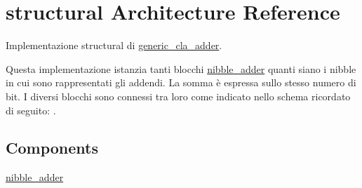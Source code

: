 \hypertarget{classgeneric__cla__adder_1_1structural}{}\section{structural Architecture Reference}
\label{classgeneric__cla__adder_1_1structural}


Implementazione structural di \hyperlink{classgeneric__cla__adder}{generic\+\_\+cla\+\_\+adder}.

Questa implementazione istanzia tanti blocchi \hyperlink{classnibble__adder}{nibble\+\_\+adder} quanti siano i nibble in cui sono rappresentati gli addendi. La somma è espressa sullo stesso numero di bit. I diversi blocchi sono connessi tra loro come indicato nello schema ricordato di seguito\+: .  


\subsection*{Components}
 \begin{DoxyCompactItemize}
\item 
\hyperlink{group___carry_loockahead_ga98a3a5b152caf0f2de1e31ac60088369}{nibble\+\_\+adder}  {\bfseries }  
\end{DoxyCompactItemize}
